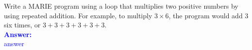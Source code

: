 \item{}
Write a MARIE program using a loop that multiplies two positive numbers by using
repeated addition. For example, to multiply $3\times6$, the program would add
$3$ six times, or $3 + 3 + 3 + 3 + 3 + 3$.\\[12pt]
\ifanswers
\textcolor{blue}{
\textbf{Answer:}\\
answer
}
\newpage
\fi

